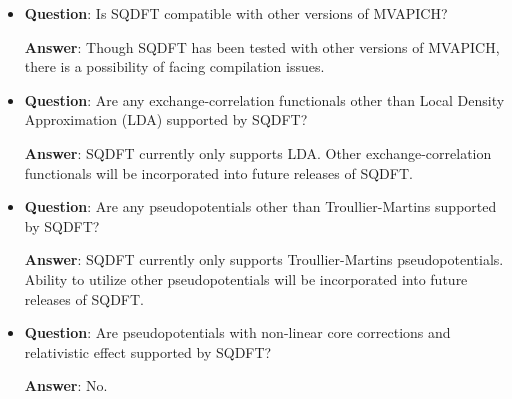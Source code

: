 \documentclass[12pt]{report}
\begin{document}
\begin{itemize}

\item{\bf{Question}}: Is SQDFT compatible with other versions of MVAPICH?

{\bf{Answer}}: Though SQDFT has been tested with other versions of MVAPICH, there is a possibility of facing compilation issues. 

\item{\bf{Question}}: Are any exchange-correlation functionals other than Local Density Approximation (LDA) supported by SQDFT?

{\bf{Answer}}: SQDFT currently only supports LDA. Other exchange-correlation functionals will be incorporated into future releases of SQDFT. 


\item{\bf{Question}}: Are any pseudopotentials other than Troullier-Martins supported by SQDFT?

{\bf{Answer}}: SQDFT currently only supports Troullier-Martins pseudopotentials. Ability to utilize other pseudopotentials will be incorporated into future releases of SQDFT. 

\item{\bf{Question}}: Are pseudopotentials with non-linear core corrections and relativistic effect supported by SQDFT?

{\bf{Answer}}: No. 



\end{itemize}



% 

\end{document}
